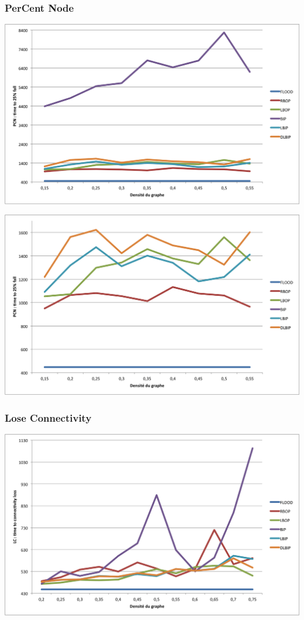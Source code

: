 \subsubsection{PerCent Node}
\begin{bigcenter}
\includegraphics[scale=0.9]{Simus/pcn_2_0}
\end{bigcenter}

\begin{bigcenter}
\includegraphics[scale=0.9]{Simus/pcn_2_0_zoom}
\end{bigcenter}


\subsubsection{Lose Connectivity}
\begin{bigcenter}
\includegraphics[scale=0.91]{Simus/lc_2_0}
\end{bigcenter}


